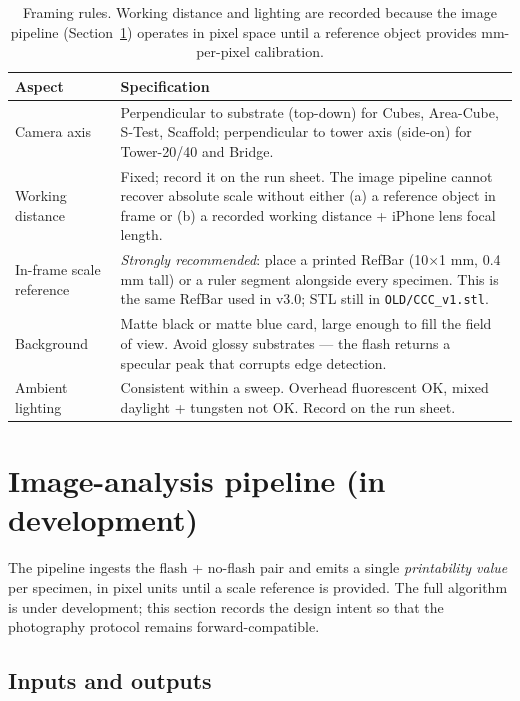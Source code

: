 \documentclass[11pt,a4paper]{article}
\begin{document}
\begin{table}[h]
\centering
\small
\begin{tabular}{p{4.2cm} p{10.2cm}}
\toprule
Aspect & Specification \\
\midrule
Camera axis & Perpendicular to substrate (top-down) for Cubes,
  Area-Cube, S-Test, Scaffold; perpendicular to tower axis
  (side-on) for Tower-20/40 and Bridge. \\
Working distance &
  Fixed; record it on the run sheet. The image pipeline cannot
  recover absolute scale without either (a) a reference object in
  frame or (b) a recorded working distance + iPhone lens focal
  length. \\
In-frame scale reference &
  \emph{Strongly recommended}: place a printed RefBar (10$\times$1
  mm, 0.4 mm tall) or a ruler segment alongside every specimen.
  This is the same RefBar used in v3.0; STL still in
  \texttt{OLD/CCC\_v1.stl}. \\
Background &
  Matte black or matte blue card, large enough to fill the field
  of view. Avoid glossy substrates --- the flash returns a
  specular peak that corrupts edge detection. \\
Ambient lighting &
  Consistent within a sweep. Overhead fluorescent OK, mixed
  daylight + tungsten not OK. Record on the run sheet. \\
\bottomrule
\end{tabular}
\caption{Framing rules. Working distance and lighting are
recorded because the image pipeline (Section~\ref{sec:imaging_algo})
operates in pixel space until a reference object provides
mm-per-pixel calibration.}
\label{tab:framing}
\end{table}

\section{Image-analysis pipeline (in development)}
\label{sec:imaging_algo}

The pipeline ingests the flash + no-flash pair and emits a
single \emph{printability value} per specimen, in pixel units
until a scale reference is provided. The full algorithm is
under development; this section records the design intent so
that the photography protocol remains forward-compatible.

\subsection{Inputs and outputs}
\end{document}
